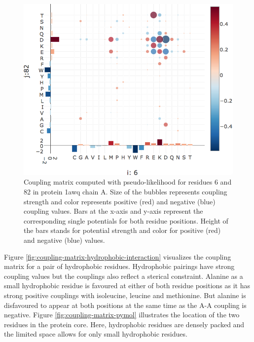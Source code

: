 \documentclass[12pt,a4paper,twoside]{book}
\theoremstyle{definition}
\theoremstyle{definition}
\theoremstyle{remark}
\begin{document}
\begin{figure}
\includegraphics[width=0.9\linewidth]{img/coupling_matrix_analysis/coupling_matrix_1a9xA05_6_82_notitle} \caption{Coupling matrix computed
with pseudo-likelihood for residues 6 and 82 in protein 1awq chain A.
Size of the bubbles represents coupling strength and color represents
positive (red) and negative (blue) coupling values. Bars at the x-axis
and y-axis represent the corresponding single potentials for both
residue positions. Height of the bars stands for potential strength and
color for positive (red) and negative (blue) values.}\label{fig:coupling-matrix-ionic-interaction}
\end{figure}

Figure \ref{fig:coupling-matrix-hydrophobic-interaction} visualizes the
coupling matrix for a pair of hydrophobic residues. Hydrophobic pairings
have strong coupling values but the couplings also reflect a sterical
constraint. Alanine as a small hydrophobic residue is favoured at either
of both residue positions as it has strong positive couplings with
isoleucine, leucine and methionine. But alanine is disfavoured to appear
at both positions at the same time as the A-A coupling is negative.
Figure \ref{fig:coupling-matrix-pymol} illustrates the location of the
two residues in the protein core. Here, hydrophobic residues are densely
packed and the limited space allows for only small hydrophobic residues.
\end{document}
